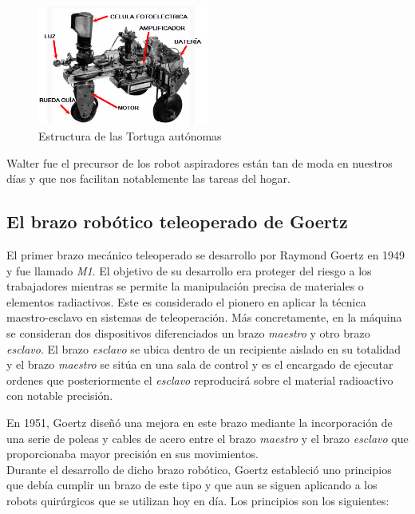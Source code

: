 \begin{figure}[H]
\begin{center}
  \includegraphics[width=0.5\textwidth]{./EtapaPrimeriza/imagenes/t1.jpg}
  \caption{Estructura de las Tortuga autónomas}
  \label{t1}
\end{center}
\end{figure}


Walter fue el precursor de los robot aspiradores están tan de moda en nuestros días y que nos facilitan notablemente las tareas del hogar.


\subsection{El brazo robótico teleoperado de Goertz}


El primer brazo mecánico teleoperado se desarrollo por Raymond Goertz en 1949 y fue llamado \textit{M1}. El objetivo de su desarrollo era proteger del riesgo a los trabajadores mientras se permite la manipulación precisa de materiales o elementos radiactivos. Este es considerado el pionero en aplicar la técnica maestro-esclavo en sistemas de teleoperación. Más concretamente, en la máquina se consideran dos dispositivos diferenciados un brazo \textit{maestro} y otro brazo \textit{esclavo}. El brazo \textit{esclavo} se ubica dentro de un recipiente aislado en su totalidad y el brazo \textit{maestro} se sitúa en una sala de control y es el encargado de ejecutar ordenes que posteriormente el \textit{esclavo} reproducirá sobre el material radioactivo con notable precisión.

En 1951, Goertz diseñó una mejora en este brazo mediante la incorporación de una serie de poleas y cables de acero entre el brazo \textit{maestro} y el brazo \textit{esclavo} que proporcionaba mayor precisión en sus movimientos.\\

Durante el desarrollo de dicho brazo robótico, Goertz estableció uno principios que debía cumplir un brazo de este tipo y que aun se siguen aplicando a los robots quirúrgicos que se utilizan hoy en día. Los principios son los siguientes:

